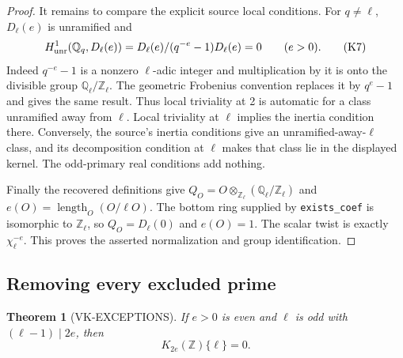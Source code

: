 \documentclass[11pt,a4paper]{article}
\newtheorem{theorem}{Theorem}[section]
\theoremstyle{definition}
\begin{document}
\begin{proof}
It remains to compare the explicit source local conditions.
For \(q\ne\ell\), \(D_\ell(e)\) is unramified and
\[
 H^1_{\rm unr}(\mathbb Q_q,D_\ell(e))
 =D_\ell(e)/(q^{-e}-1)D_\ell(e)=0 \qquad(e>0).         \tag{K7}
\]
Indeed \(q^{-e}-1\) is a nonzero \(\ell\)-adic integer and
multiplication by it is onto the divisible group
\(\mathbb Q_\ell/\mathbb Z_\ell\).
The geometric Frobenius convention replaces it by \(q^e-1\)
and gives the same result. Thus local triviality at 2 is
automatic for a class unramified away from \(\ell\).
Local triviality at \(\ell\) implies the inertia condition there.
Conversely, the source's inertia conditions give an
unramified-away-\(\ell\) class, and its decomposition condition
at \(\ell\) makes that class lie in the displayed kernel.
The odd-primary real conditions add nothing.

Finally the recovered definitions give
\(Q_O=O\otimes_{\mathbb Z_\ell}
(\mathbb Q_\ell/\mathbb Z_\ell)\) and
\(e(O)=\operatorname{length}_O(O/\ell O)\).
The bottom ring supplied by \texttt{exists\_coef} is isomorphic
to \(\mathbb Z_\ell\), so \(Q_O=D_\ell(0)\) and \(e(O)=1\).
The scalar twist is exactly \(\chi_\ell^{-e}\).
This proves the asserted normalization and group identification.
\end{proof}

\subsection{Removing every excluded prime}

\begin{theorem}[VK-EXCEPTIONS]
If \(e>0\) is even and \(\ell\) is odd with
\((\ell-1)\mid2e\), then
\[
 K_{2e}(\mathbb Z)\{\ell\}=0.                         \tag{K8}
\]
\end{theorem}
\end{document}
